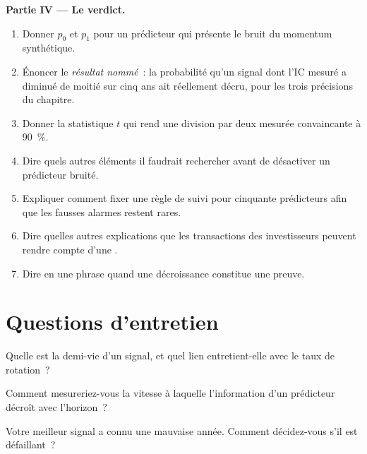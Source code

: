 \begin{problem}
\medskip\noindent\textbf{Partie IV --- Le verdict.}
\begin{enumerate}[resume]
\item Donner $p_0$ et $p_1$ pour un prédicteur qui présente le bruit du momentum synthétique.
\item Énoncer le \emph{résultat nommé}~: la probabilité qu'un signal dont l'IC mesuré a diminué de moitié sur cinq ans ait réellement décru, pour les trois
précisions du chapitre.
\item Donner la statistique $t$ qui rend une division par deux mesurée convaincante à 90~\%.
\item Dire quels autres éléments il faudrait rechercher avant de désactiver un prédicteur bruité.
\item Expliquer comment fixer une règle de suivi pour cinquante prédicteurs afin que les fausses alarmes restent rares.
\item Dire quelles autres explications que les transactions des investisseurs peuvent rendre compte d'une .
\item Dire en une phrase quand une décroissance constitue une preuve.
\end{enumerate}
\end{problem}

\section{Questions d'entretien}

\begin{interviewq}\label{iq:rs:half-life-decay-and-stability:1}
Quelle est la demi-vie d'un signal, et quel lien entretient-elle avec le taux de rotation~?
\end{interviewq}

\begin{interviewq}\label{iq:rs:half-life-decay-and-stability:2}
Comment mesureriez-vous la vitesse à laquelle l'information d'un prédicteur décroît avec l'horizon~?
\end{interviewq}

\begin{interviewq}\label{iq:rs:half-life-decay-and-stability:3}
Votre meilleur signal a connu une mauvaise année. Comment décidez-vous s'il est défaillant~?
\end{interviewq}

